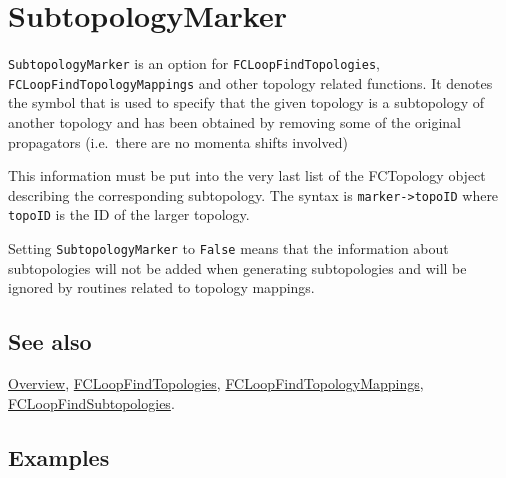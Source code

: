 \documentclass[../FeynCalcManual.tex]{subfiles}
\begin{document}
\hypertarget{subtopologymarker}{
\section{SubtopologyMarker}\label{subtopologymarker}}

\texttt{SubtopologyMarker} is an option for
\texttt{FCLoopFindTopologies}, \texttt{FCLoopFindTopologyMappings} and
other topology related functions. It denotes the symbol that is used to
specify that the given topology is a subtopology of another topology and
has been obtained by removing some of the original propagators
(i.e.~there are no momenta shifts involved)

This information must be put into the very last list of the FCTopology
object describing the corresponding subtopology. The syntax is
\texttt{marker->topoID} where \texttt{topoID} is the ID of the larger
topology.

Setting \texttt{SubtopologyMarker} to \texttt{False} means that the
information about subtopologies will not be added when generating
subtopologies and will be ignored by routines related to topology
mappings.

\subsection{See also}

\hyperlink{toc}{Overview},
\hyperlink{fcloopfindtopologies}{FCLoopFindTopologies},
\hyperlink{fcloopfindtopologymappings}{FCLoopFindTopologyMappings},
\hyperlink{fcloopfindsubtopologies}{FCLoopFindSubtopologies}.

\subsection{Examples}
\end{document}
